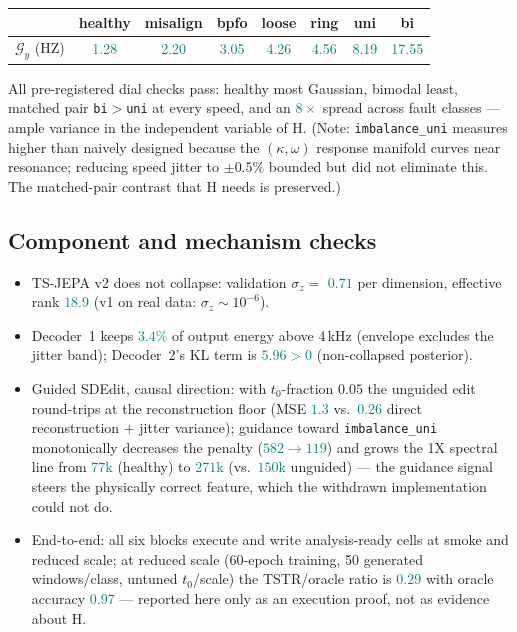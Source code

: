 \documentclass[11pt]{article}
\newcommand{\Gng}{\mathcal{G}}
\newcommand{\measured}[1]{\textcolor{teal}{#1}}
\newcommand{\code}[1]{\texttt{\small #1}}
\begin{document}
\begin{center}\small
\begin{tabular}{lccccccc}
\toprule
 & healthy & misalign & bpfo & loose & ring & uni & bi\\
\midrule
$\Gng_y$ (HZ) & \measured{1.28} & \measured{2.20} & \measured{3.05} &
\measured{4.26} & \measured{4.56} & \measured{8.19} & \measured{17.55}\\
\bottomrule
\end{tabular}
\end{center}

All pre-registered dial checks pass: healthy most Gaussian, bimodal least,
matched pair \code{bi}$>$\code{uni} at every speed, and an
\measured{$8\times$} spread across fault classes --- ample variance in the
independent variable of H. (Note: \code{imbalance\_uni} measures higher than
naively designed because the $(\kappa,\omega)$ response manifold curves near
resonance; reducing speed jitter to $\pm0.5\%$ bounded but did not eliminate
this. The matched-pair contrast that H needs is preserved.)

\subsection{Component and mechanism checks}
\begin{itemize}[leftmargin=1.6em,itemsep=1pt]
\item TS-JEPA v2 does not collapse: validation $\sigma_z=$
\measured{$0.71$} per dimension, effective rank \measured{$18.9$}
(v1 on real data: $\sigma_z\sim 10^{-6}$).
\item Decoder~1 keeps \measured{$3.4\%$} of output energy above 4\,kHz
(envelope excludes the jitter band); Decoder~2's KL term is
\measured{$5.96 > 0$} (non-collapsed posterior).
\item Guided SDEdit, causal direction: with $t_0$-fraction $0.05$ the
unguided edit round-trips at the reconstruction floor (MSE
\measured{$1.3$} vs.\ \measured{$0.26$} direct reconstruction $+$ jitter
variance); guidance toward \code{imbalance\_uni} monotonically decreases the
penalty (\measured{$582\to119$}) and grows the 1X spectral line from
\measured{$77\mathrm{k}$} (healthy) to \measured{$271\mathrm{k}$}
(vs.\ \measured{$150\mathrm{k}$} unguided) --- the guidance signal steers the
physically correct feature, which the withdrawn implementation could not do.
\item End-to-end: all six blocks execute and write analysis-ready cells at
smoke and reduced scale; at reduced scale (60-epoch training, 50 generated
windows/class, untuned $t_0$/scale) the TSTR/oracle ratio is
\measured{$0.29$} with oracle accuracy \measured{$0.97$} --- reported here
only as an execution proof, not as evidence about H.
\end{itemize}
\end{document}
